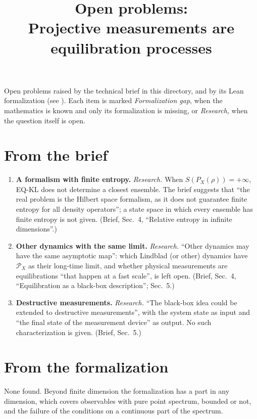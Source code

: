 \documentclass[11pt]{article}
\title{Open problems:\\ Projective measurements are equilibration processes}
\author{}
\date{}
\begin{document}
\maketitle

\noindent
Open problems raised by the technical brief in this directory, and by its Lean formalization
(see ).
Each item is marked \emph{Formalization gap}, when the mathematics is known and only its
formalization is missing, or \emph{Research}, when the question itself is open.

\section*{From the brief}
\begin{enumerate}
\item \textbf{A formalism with finite entropy.} \emph{Research.} When $S(P_X(\rho)) = +\infty$,
  EQ-KL does not determine a closest ensemble. The brief suggests that ``the real problem is the
  Hilbert space formalism, as it does not guarantee finite entropy for all density operators''; a
  state space in which every ensemble has finite entropy is not given. (Brief, Sec.~4, ``Relative
  entropy in infinite dimensions''.)
\item \textbf{Other dynamics with the same limit.} \emph{Research.} ``Other dynamics may have the
  same asymptotic map'': which Lindblad (or other) dynamics have $\mathcal{P}_X$ as their
  long-time limit, and whether physical measurements are equilibrations ``that happen at a fast
  scale'', is left open. (Brief, Sec.~4, ``Equilibration as a black-box description''; Sec.~5.)
\item \textbf{Destructive measurements.} \emph{Research.} ``The black-box idea could be extended
  to destructive measurements'', with the system state as input and ``the final state of the
  measurement device'' as output. No such characterization is given. (Brief, Sec.~5.)
\end{enumerate}

\section*{From the formalization}
\noindent None found. Beyond finite dimension the formalization has a part in any dimension, which
covers observables with pure point spectrum, bounded or not, and the failure of the conditions on
a continuous part of the spectrum.
\end{document}
